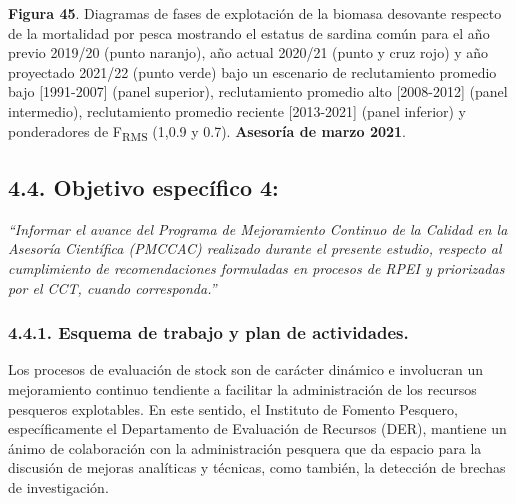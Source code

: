 \documentclass[
  spanish,
]{article}
\begin{document}
\small

\textbf{Figura 45}. Diagramas de fases de explotación de la biomasa
desovante respecto de la mortalidad por pesca mostrando el estatus de
sardina común para el año previo 2019/20 (punto naranjo), año actual
2020/21 (punto y cruz rojo) y año proyectado 2021/22 (punto verde) bajo
un escenario de reclutamiento promedio bajo {[}1991-2007{]} (panel
superior), reclutamiento promedio alto {[}2008-2012{]} (panel
intermedio), reclutamiento promedio reciente {[}2013-2021{]} (panel
inferior) y ponderadores de F\textsubscript{RMS} (1,0.9 y 0.7).
\textbf{Asesoría de marzo 2021}. \vspace{0.5cm} \normalsize
\vspace{0.5cm}

\normalsize

\pagebreak

\hypertarget{objetivo-especuxedfico-4-1}{%
\subsection{4.4. Objetivo específico
4:}\label{objetivo-especuxedfico-4-1}}

\vspace{-0.2cm}

\emph{``Informar el avance del Programa de Mejoramiento Continuo de la
Calidad en la Asesoría Científica (PMCCAC) realizado durante el presente
estudio, respecto al cumplimiento de recomendaciones formuladas en
procesos de RPEI y priorizadas por el CCT, cuando corresponda.''}

\hypertarget{esquema-de-trabajo-y-plan-de-actividades.}{%
\subsubsection{4.4.1. Esquema de trabajo y plan de
actividades.}\label{esquema-de-trabajo-y-plan-de-actividades.}}

Los procesos de evaluación de stock son de carácter dinámico e
involucran un mejoramiento continuo tendiente a facilitar la
administración de los recursos pesqueros explotables. En este sentido,
el Instituto de Fomento Pesquero, específicamente el Departamento de
Evaluación de Recursos (DER), mantiene un ánimo de colaboración con la
administración pesquera que da espacio para la discusión de mejoras
analíticas y técnicas, como también, la detección de brechas de
investigación.
\end{document}
